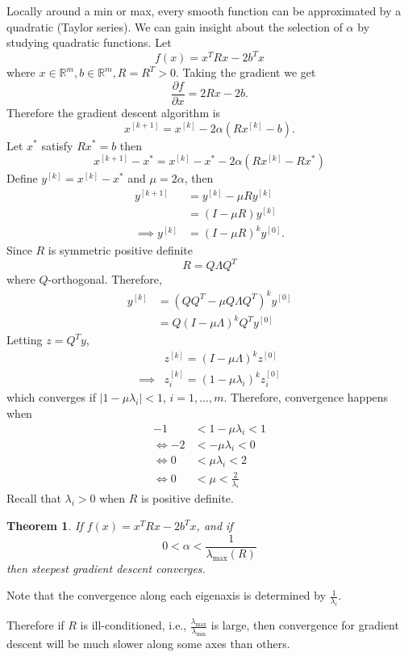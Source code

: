 \documentclass{article}
\newtheorem{theorem}{Theorem}[section]
\newcommand{\abs}[1]{\left|{#1}\right|}
\begin{document}
	Locally around a min or max, every smooth function can be approximated by a quadratic (Taylor series).  
%		
	We can gain insight about the selection of $\alpha$ by studying quadratic functions.
	Let 
	\[
	f(x) = x^TRx - 2b^Tx
	\]
	where $x \in \mathbb{R}^m,b\in\mathbb{R}^m,R=R^T>0$.	
	Taking the gradient we get
	\[ 
		\frac{\partial f}{\partial x} = 2Rx - 2b.
	\]
%
	Therefore the gradient descent algorithm is
	\[ 
		x^{[k+1]} = x^{[k]} - 2\alpha(Rx^{[k]} - b). 
	\]
	Let $x^{\ast}$ satisfy $Rx^{\ast}=b$ then
	\[ 
		x^{[k+1]} - x^{\ast} = x^{[k]} - x^{\ast} - 2\alpha(Rx^{[k]} - Rx^{\ast}) 
	\]
	Define $y^{[k]} = x^{[k]} - x^{\ast}$ and $\mu = 2\alpha$, then 
	\begin{align*}
		y^{[k+1]} 
			&= y^{[k]} - \mu R y^{[k]} \\
			&= (I - \mu R)y^{[k]}\\
		\implies y^{[k]} &= (I - \mu R)^ky^{[0]}.
	\end{align*}	
%
	Since $R$ is symmetric positive definite
	\[ 
		R = Q\Lambda Q^T 
	\]
	where $Q$-orthogonal.
	Therefore,
	\begin{align*}
		y^{[k]} 
			&= (QQ^T-\mu Q\Lambda Q^T)^ky^{[0]}\\
			&= Q(I-\mu\Lambda)^kQ^Ty^{[0]}
	\end{align*}
	Letting $z = Q^Ty$,
	\begin{align}
		& z^{[k]} = (I - \mu\Lambda)^kz^{[0]}\\
		\implies &
		z^{[k]}_i = (1 - \mu \lambda_i)^kz_i^{[0]}
	\end{align}
	which converges if $\abs{1-\mu\lambda_i} < 1$, $i = 1, \ldots, m$.	
%
	Therefore, convergence happens when
	\begin{align*}
	-1 &< 1 - \mu \lambda_i < 1 \\
	\iff -2 &< -\mu\lambda_i < 0\\
	\iff 0 &< \mu\lambda_i < 2\\
	\iff 0 &< \mu < \frac{2}{\lambda_i} 
	\end{align*}
	Recall that $\lambda_i > 0$ when $R$ is positive definite.
	\begin{theorem}
	If $f(x) = x^TRx - 2b^Tx$, and if
	\[ 
		0 < \alpha < \frac{1}{\lambda_{\max}(R)} 
	\]
	then steepest gradient descent converges.
	\end{theorem}

	Note that the convergence along each eigenaxis is determined by 
	\(
		\frac{1}{\lambda_i}.
	\)	
	
	Therefore if $R$ is ill-conditioned, i.e., $\displaystyle \frac{\lambda_{\max}}{\lambda_{\min}}$ is large, then convergence for gradient descent will be much slower along some axes than others.	
\end{document}
